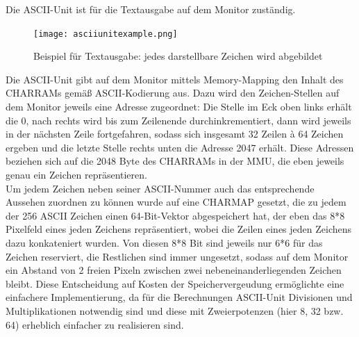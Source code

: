 
\label{ch:asciiunit}
Die ASCII-Unit ist f\"ur die Textausgabe auf dem Monitor zust\"andig.

\begin{figure}[!htbp]
	\centering
	\texttt{[image: asciiunitexample.png]}
	\caption{Beispiel f\"ur Textausgabe: jedes darstellbare Zeichen wird abgebildet}
	\label{fig:exampletext}
\end{figure}


Die ASCII-Unit gibt auf dem Monitor mittels Memory-Mapping den Inhalt des CHARRAMs gem{\"a}{\ss} ASCII-Kodierung aus. Dazu wird den Zeichen-Stellen auf dem Monitor jeweils eine Adresse zugeordnet: Die Stelle im Eck oben links erh\"alt die 0, nach rechts wird bis zum Zeilenende durchinkrementiert, dann wird jeweils in der n\"achsten Zeile fortgefahren, sodass sich insgesamt 32 Zeilen \`a 64 Zeichen ergeben und die letzte Stelle rechts unten die Adresse 2047 erh\"alt. Diese Adressen beziehen sich auf die 2048 Byte des CHARRAMs in der MMU, die eben jeweils genau ein Zeichen repr\"asentieren.\\
Um jedem Zeichen neben seiner ASCII-Nummer auch das entsprechende Aussehen zuordnen zu k\"onnen wurde auf eine CHARMAP gesetzt, die zu jedem der 256 ASCII Zeichen einen 64-Bit-Vektor abgespeichert hat, der eben das 8*8 Pixelfeld eines jeden Zeichens repr\"asentiert, wobei die Zeilen eines jeden Zeichens dazu konkateniert wurden. Von diesen 8*8 Bit sind jeweils nur 6*6 f\"ur das Zeichen reserviert, die Restlichen sind immer ungesetzt, sodass auf dem Monitor ein Abstand von 2 freien Pixeln zwischen zwei nebeneinanderliegenden Zeichen bleibt. Diese Entscheidung auf Kosten der Speichervergeudung erm\"oglichte eine einfachere Implementierung, da f\"ur die Berechnungen ASCII-Unit Divisionen und Multiplikationen notwendig sind und diese mit Zweierpotenzen (hier 8, 32 bzw. 64) erheblich einfacher zu realisieren sind.

